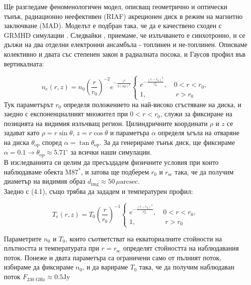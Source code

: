 \documentclass[12pt]{article}
\numberwithin{equation}{section}
\numberwithin{figure}{section}
\begin{document}
	Ще разгледаме феноменологичен модел, описващ геометрично и оптически тънък, радиационно неефективен (RIAF) акреционен диск в режим на магнитно заключване (MAD). Моделът е подбран така, че да е качествено сходен с GRMHD симулации \cite{Yuan2003}. Следвайки \cite{Broderick2021}, \cite{Gold2020} приемаме, че излъчването е синхотронно, и се дължи на два отделни електронни ансамбъла - топлинен и не-топлинен. Описваме колективно и двата със степенен закон в радиалната посока, и Гаусов профил във вертикалната:
	
	\begin{equation}
		n_e(r,z) = n_0\left(\frac{r}{r_0}\right)^{-2}e^{-\frac{z^2}{2(\alpha\rho)^2}}
		\begin{cases}
			e^{-\frac{(r-r_0)^2}{r^2_{\text{sc}}}},\quad 0 < r < r_0,\\
			1,\,\,\qquad\qquad r>r_0
		\end{cases}
	\end{equation}
	Тук параметърът $r_0$ определя положението на най-високо сгъстяване на диска, и заедно с експоненциалният множител при $0 < r < r_0$, служи за фиксиране на позицията на видимия излъчващ регион. Цилиндричните координати $\rho$ и $z$ се задават като $\rho = r\sin\theta$, $z = r\cos\theta$ и параметъра $\alpha$ определя ъгъла на отваряне на диска $\theta_{\text{op}}$ според $\alpha = \tan\theta_\text{op}$. За да генерираме тънък диск, ще фиксираме $\alpha = 0.1 \rightarrow \theta_{\text{op}}\approx 5.71^\circ$ за всички наши симулации.\\
	В изследванията си целим да пресъздадем физичните условия при които наблюдаваме обекта M87$^*$, и затова ще подберем $r_0$ и $r_\text{sc}$ така, че да получим диаметър на видимия образ $d_\text{img}\approx 50\, \mu\text{arcsec}$.\\
	
	Заедно с (4.1), също трябва да зададем и температурен профил:
	
	\begin{equation}
		T_e(r,z) = T_0\left(\frac{r}{r_0}\right)^{-1}
		\begin{cases}
			e^{-\frac{(r-r_0)^2}{r^2_{\text{sc}}}},\quad 0 < r < r_0,\\
			1,\,\,\qquad\qquad r>r_0
		\end{cases}
	\end{equation}
	
	Параметрите $n_0$ и $T_0$, които съответстват на екваториалните стойности на плътността и температурата при $r = r_\text{sc}$ определят стойността на наблюдавания поток. Понеже и двата параметъра са ограничени само от пълният поток, избираме да фиксираме $n_0$, и да варираме $T_0$ така, че да получим наблюдаван поток $F_{\text{230 GHz}} \approx 0.5 \text{Jy}$\\
	
\end{document}
